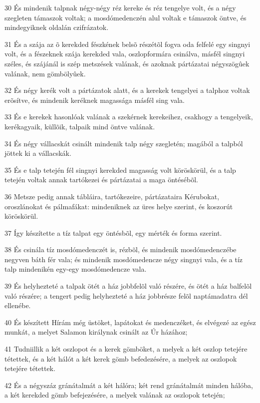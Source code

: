 \par 30 És mindenik talpnak négy-négy réz kereke és réz tengelye volt, és a négy szegleten támaszok voltak; a mosdómedenczén alul voltak e támaszok öntve, és mindegyiknek oldalán czifrázatok.
\par 31 És a szája az õ kerekded fészkének belsõ részétõl fogva oda felfelé egy singnyi volt, és a fészeknek szája kerekded vala, oszlopformára csinálva, másfél singnyi széles, és szájánál is szép metszések valának, és azoknak pártázatai négyszögûek valának, nem gömbölyûek.
\par 32 És négy kerék volt a pártázatok alatt, és a kerekek tengelyei a talphoz voltak erõsítve, és mindenik keréknek magassága másfél sing vala.
\par 33 És e kerekek hasonlóak valának a szekérnek kerekeihez, csakhogy a tengelyeik, kerékagyaik, küllõik, talpaik mind öntve valának.
\par 34 És négy vállacskát csinált mindenik talp négy szegletén; magából a talpból jöttek ki a vállacskák.
\par 35 És e talp tetején fél singnyi kerekded magasság volt köröskörül, és a talp tetején voltak annak tartókezei és pártázatai a maga öntésébõl.
\par 36 Metsze pedig annak tábláira, tartókezeire, pártázataira Kérubokat, oroszlánokat és pálmafákat: mindeniknek az üres helye szerint, és koszorút köröskörül.
\par 37 Így készítette a tíz talpat egy öntésbõl, egy mérték és forma szerint.
\par 38 És csinála tíz mosdómedenczét is, rézbõl, és mindenik mosdómedenczébe negyven báth fér vala; és mindenik mosdómedencze négy singnyi vala, és a tíz talp mindenikén egy-egy mosdómedencze vala.
\par 39 És helyhezteté a talpak ötét a ház jobbfelõl való részére, és ötét a ház balfelõl való részére; a tengert pedig helyhezteté a ház jobbrésze felõl naptámadatra dél ellenébe.
\par 40 És készített Hírám még üstöket, lapátokat és medenczéket, és elvégezé az egész munkát, a melyet Salamon királynak csinált az Úr házához;
\par 41 Tudniillik a két oszlopot és a kerek gömböket, a melyek a két oszlop tetejére tétettek, és a két hálót a két kerek gömb befedezésére, a melyek az oszlopok tetejére tétettek.
\par 42 És a négyszáz gránátalmát a két hálóra; két rend gránátalmát minden hálóba, a két kerekded gömb befejezésére, a melyek valának az oszlopok tetején;
